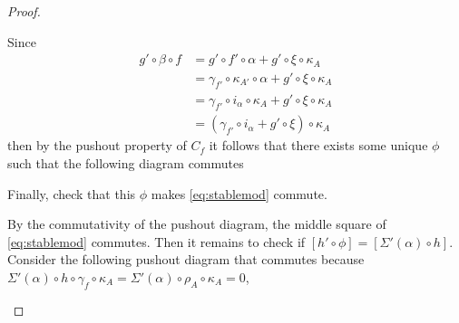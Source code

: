 \begin{proof}
\begin{enumerate}[label={(\bfseries TR\arabic*)}]
{            Since
            \begin{align*}
                g' \circ \beta \circ f &= g' \circ f' \circ \alpha + g' \circ \xi \circ \kappa_A \\
                &= \gamma_{f'} \circ \kappa_{A'} \circ \alpha + g' \circ \xi \circ \kappa_A \\
                &= \gamma_{f'} \circ i_{\alpha} \circ \kappa_A + g' \circ \xi \circ \kappa_A \\
                &= (\gamma_{f'} \circ i_{\alpha} + g' \circ \xi) \circ \kappa_A
            \end{align*}
            then by the pushout property of \( C_f \) it follows that there exists some unique \( \phi \) such that the following diagram commutes
            \begin{center}
            \end{center}

            Finally, check that this \( \phi \) makes \autoref{eq:stablemod} commute.

            By the commutativity of the pushout diagram, the middle square of \autoref{eq:stablemod} commutes. Then it remains to check if \( [h' \circ \phi] = [\Sigma' (\alpha) \circ h] \). Consider the following pushout diagram that commutes because \( \Sigma'(\alpha) \circ h \circ \gamma_f \circ \kappa_A = \Sigma'(\alpha) \circ \rho_A \circ \kappa_A = 0 \),
            \begin{center}
\end{center}}
\end{enumerate}
\end{proof}
